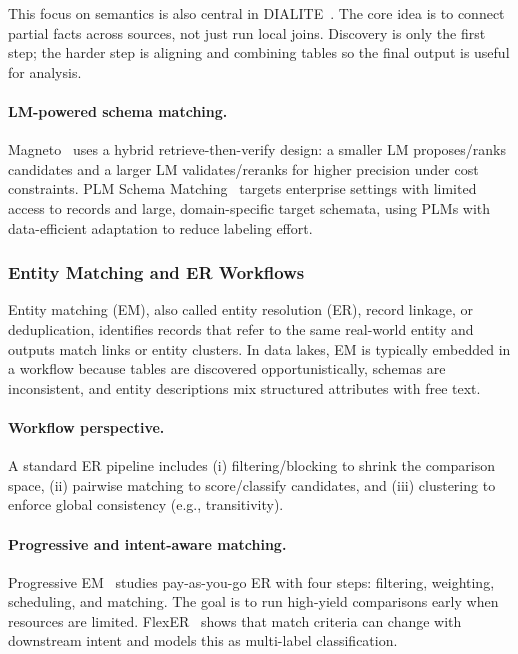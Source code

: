 \documentclass[sigconf,nonacm]{acmart}
\begin{document}
This focus on semantics is also central in DIALITE~\cite{10.1145/3555041.3589732}. The core idea is to connect partial facts across sources, not just run local joins. Discovery is only the first step; the harder step is aligning and combining tables so the final output is useful for analysis.

\paragraph{LM-powered schema matching.}
Magneto~\cite{10.14778/3742728.3742757} uses a hybrid retrieve-then-verify design: a smaller LM proposes/ranks candidates and a larger LM validates/reranks for higher precision under cost constraints. PLM Schema Matching~\cite{10184612} targets enterprise settings with limited access to records and large, domain-specific target schemata, using PLMs with data-efficient adaptation to reduce labeling effort.


\subsubsection{Entity Matching and ER Workflows}

Entity matching (EM), also called entity resolution (ER), record linkage, or deduplication, identifies records that refer to the same real-world entity and outputs
match links or entity clusters. In data lakes, EM is typically embedded in a workflow because tables are discovered
opportunistically, schemas are inconsistent, and entity descriptions mix structured attributes with free text.

\paragraph{Workflow perspective.}
A standard ER pipeline includes (i) filtering/blocking to shrink the comparison space, (ii) pairwise matching to score/classify candidates, and (iii) clustering to enforce global consistency (e.g., transitivity).

\paragraph{Progressive and intent-aware matching.}
Progressive EM~\cite{10.1145/3709715} studies pay-as-you-go ER with four steps: filtering, weighting, scheduling, and matching. The goal is to run high-yield comparisons early when resources are limited. FlexER~\cite{10.1145/3588722} shows that match criteria can change with downstream intent and models this as multi-label classification.
\end{document}
